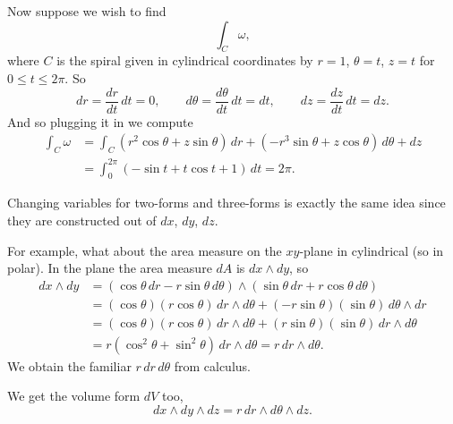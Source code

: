 \documentclass[12pt]{article}
\begin{document}
Now suppose we wish to find
\[
\int_C \omega ,
\]
where $C$ is the spiral given
in cylindrical coordinates by
$r =1$, $\theta = t$, $z = t$ for $0 \leq t \leq 2 \pi$.
So
\[
dr = \frac{dr}{dt} \, dt = 0,
\qquad
d\theta = \frac{d\theta}{dt} \, dt = dt,
\qquad
dz = \frac{dz}{dt} \, dt = dz.
\]
And so plugging it in we compute
\begin{equation*}
\begin{split}
\int_C \omega
& =
\int_C ( r^2 \cos \theta + z \sin \theta) \, dr
+ (- r^3 \sin \theta + z \cos \theta ) \, d\theta
+ dz
\\
& =
\int_0^{2\pi}
(- \sin t + t \cos t + 1 ) \, dt
= 2 \pi .
\end{split}
\end{equation*}

Changing variables for two-forms
and three-forms is exactly the same idea since they are constructed out of $dx$, $dy$, $dz$.

For example,
what about the area measure on the $xy$-plane in cylindrical (so in polar).
In the plane
the area measure $dA$ is $dx \wedge dy$, so
\begin{equation*}
\begin{split}
dx \wedge dy
& =
(\cos \theta \, dr - r \sin \theta \, d \theta)
\wedge
(\sin \theta \, dr + r \cos \theta \, d \theta)
\\
& =
(\cos \theta) (r \cos \theta) \, dr \wedge d\theta
+
(-r \sin \theta) (\sin \theta) \, d\theta \wedge dr
\\
& =
(\cos \theta) (r \cos \theta) \, dr \wedge d\theta
+
(r \sin \theta) (\sin \theta) \, dr \wedge d\theta
\\
& =
r(\cos^2 \theta + \sin^2 \theta) \, dr \wedge d\theta
=
r \, dr \wedge d\theta .
\end{split}
\end{equation*}
We obtain the familiar $r \,dr \,d\theta$ from calculus.

We get the volume form $dV$ too,
\[
dx \wedge dy \wedge dz
= r \, dr \wedge d\theta \wedge dz .
\]
\end{document}
